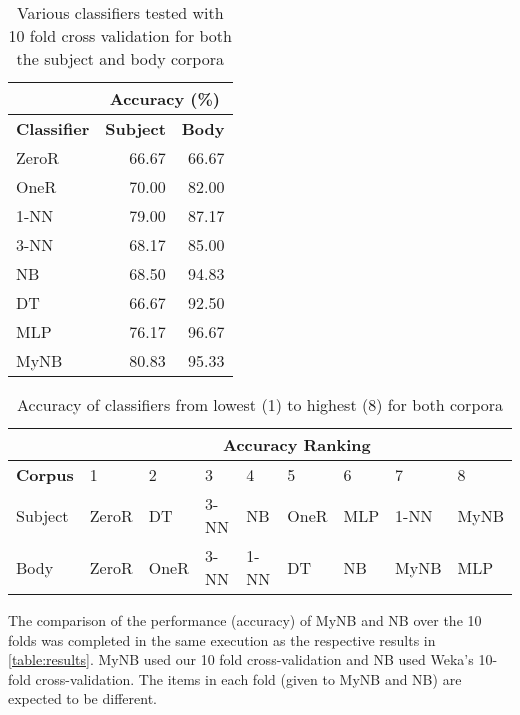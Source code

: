 \documentclass[10pt, a4paper]{article}
\begin{document}
\begin{table}[H]
\centering
\caption{Various classifiers tested with 10 fold cross validation for both the subject and body corpora}
\begin{tabular}{@{}lrr@{}}
\toprule
& \multicolumn{2}{c}{\textbf{Accuracy (\%)}} \\
\midrule
\textbf{Classifier} & \textbf{Subject} & \textbf{Body} \\
\midrule
ZeroR & 66.67 & 66.67 \\
OneR & 70.00 & 82.00 \\
1-NN & 79.00 & 87.17 \\
3-NN & 68.17 & 85.00 \\
NB & 68.50 & 94.83 \\
DT & 66.67 & 92.50 \\
MLP & 76.17 & 96.67 \\
MyNB & 80.83 & 95.33 \\
\bottomrule
\end{tabular}
\label{table:results}
\end{table}

\begin{table}[H]
\centering
\caption{Accuracy of classifiers from lowest (1) to highest (8) for both corpora}
\begin{tabular}{@{} l llllllll @{}}
\toprule
& \multicolumn{8}{c}{\textbf{Accuracy Ranking}} \\
\midrule
\textbf{Corpus} & 1 & 2 & 3 & 4 & 5 & 6 & 7 & 8 \\
\midrule
Subject & ZeroR & DT & 3-NN & NB & OneR & MLP & 1-NN & MyNB\\
Body & ZeroR & OneR & 3-NN & 1-NN & DT & NB & MyNB & MLP\\
\bottomrule
\end{tabular}
\label{table:accuracyofclassifiers}
\end{table}

The comparison of the performance (accuracy) of MyNB and NB over the 10 folds was completed in the same execution as the respective results in \autoref{table:results}. MyNB used our 10 fold cross-validation and NB used Weka's 10-fold cross-validation. The items in each fold (given to MyNB and NB) are expected to be different.
\end{document}

